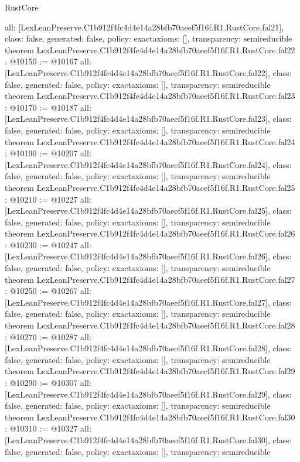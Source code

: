 \begin{lexlean}{RustCore}
\begin{coremodule}
{  all: [LexLeanPreserve.C1b912f4fc4d4e14a28bfb70aeef5f16f.R1.RustCore.fal21],
  class: false,
  generated: false,
  policy: exact{axioms: []},
  transparency: semireducible
}
theorem LexLeanPreserve.C1b912f4fc4d4e14a28bfb70aeef5f16f.R1.RustCore.fal22 : @10150 := @10167 {
  all: [LexLeanPreserve.C1b912f4fc4d4e14a28bfb70aeef5f16f.R1.RustCore.fal22],
  class: false,
  generated: false,
  policy: exact{axioms: []},
  transparency: semireducible
}
theorem LexLeanPreserve.C1b912f4fc4d4e14a28bfb70aeef5f16f.R1.RustCore.fal23 : @10170 := @10187 {
  all: [LexLeanPreserve.C1b912f4fc4d4e14a28bfb70aeef5f16f.R1.RustCore.fal23],
  class: false,
  generated: false,
  policy: exact{axioms: []},
  transparency: semireducible
}
theorem LexLeanPreserve.C1b912f4fc4d4e14a28bfb70aeef5f16f.R1.RustCore.fal24 : @10190 := @10207 {
  all: [LexLeanPreserve.C1b912f4fc4d4e14a28bfb70aeef5f16f.R1.RustCore.fal24],
  class: false,
  generated: false,
  policy: exact{axioms: []},
  transparency: semireducible
}
theorem LexLeanPreserve.C1b912f4fc4d4e14a28bfb70aeef5f16f.R1.RustCore.fal25 : @10210 := @10227 {
  all: [LexLeanPreserve.C1b912f4fc4d4e14a28bfb70aeef5f16f.R1.RustCore.fal25],
  class: false,
  generated: false,
  policy: exact{axioms: []},
  transparency: semireducible
}
theorem LexLeanPreserve.C1b912f4fc4d4e14a28bfb70aeef5f16f.R1.RustCore.fal26 : @10230 := @10247 {
  all: [LexLeanPreserve.C1b912f4fc4d4e14a28bfb70aeef5f16f.R1.RustCore.fal26],
  class: false,
  generated: false,
  policy: exact{axioms: []},
  transparency: semireducible
}
theorem LexLeanPreserve.C1b912f4fc4d4e14a28bfb70aeef5f16f.R1.RustCore.fal27 : @10250 := @10267 {
  all: [LexLeanPreserve.C1b912f4fc4d4e14a28bfb70aeef5f16f.R1.RustCore.fal27],
  class: false,
  generated: false,
  policy: exact{axioms: []},
  transparency: semireducible
}
theorem LexLeanPreserve.C1b912f4fc4d4e14a28bfb70aeef5f16f.R1.RustCore.fal28 : @10270 := @10287 {
  all: [LexLeanPreserve.C1b912f4fc4d4e14a28bfb70aeef5f16f.R1.RustCore.fal28],
  class: false,
  generated: false,
  policy: exact{axioms: []},
  transparency: semireducible
}
theorem LexLeanPreserve.C1b912f4fc4d4e14a28bfb70aeef5f16f.R1.RustCore.fal29 : @10290 := @10307 {
  all: [LexLeanPreserve.C1b912f4fc4d4e14a28bfb70aeef5f16f.R1.RustCore.fal29],
  class: false,
  generated: false,
  policy: exact{axioms: []},
  transparency: semireducible
}
theorem LexLeanPreserve.C1b912f4fc4d4e14a28bfb70aeef5f16f.R1.RustCore.fal30 : @10310 := @10327 {
  all: [LexLeanPreserve.C1b912f4fc4d4e14a28bfb70aeef5f16f.R1.RustCore.fal30],
  class: false,
  generated: false,
  policy: exact{axioms: []},
  transparency: semireducible
}
\end{coremodule}
\end{lexlean}
